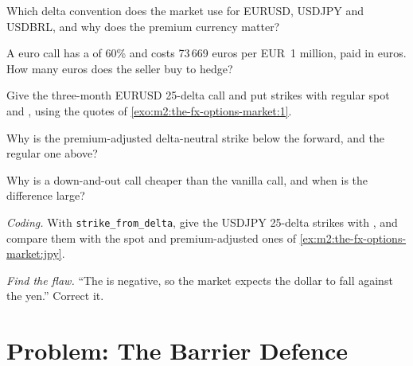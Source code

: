 \begin{exercise}[$\star$]\label{exo:m2:the-fx-options-market:2}
Which delta convention does the market use for EURUSD, USDJPY and USDBRL, and why
does the premium currency matter?
\end{exercise}

\begin{exercise}[$\star$]\label{exo:m2:the-fx-options-market:3}
A euro call has a  of 60\% and costs 73\,669 euros per EUR~1 million,
paid in euros. How many euros does the seller buy to hedge?
\end{exercise}

\begin{exercise}[$\star\star$]\label{exo:m2:the-fx-options-market:4}
Give the three-month EURUSD 25-delta call and put strikes with regular spot and
, using the quotes of \cref{exo:m2:the-fx-options-market:1}.
\end{exercise}

\begin{exercise}[$\star\star$]\label{exo:m2:the-fx-options-market:5}
Why is the premium-adjusted delta-neutral strike below the forward, and the
regular one above?
\end{exercise}

\begin{exercise}[$\star\star$]\label{exo:m2:the-fx-options-market:6}
Why is a down-and-out call cheaper than the vanilla call, and when is the
difference large?
\end{exercise}

\begin{exercise}[$\star\star\star$]\label{exo:m2:the-fx-options-market:7}
\emph{Coding.} With \texttt{strike\_from\_delta}, give the USDJPY 25-delta strikes
with , and compare them with the spot and premium-adjusted ones of
\cref{ex:m2:the-fx-options-market:jpy}.
\end{exercise}

\begin{exercise}[$\star\star\star$]\label{exo:m2:the-fx-options-market:8}
\emph{Find the flaw.} ``The  is negative, so the market expects the
dollar to fall against the yen.'' Correct it.
\end{exercise}

\section{Problem: The Barrier Defence}


